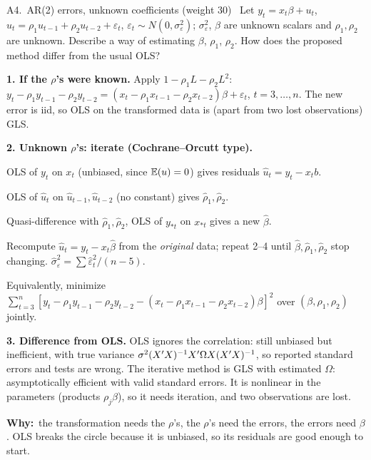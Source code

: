 \documentclass[11pt]{article}
\newcommand{\tagbox}[2]{\tcbox[on line, colback=#1, colframe=#1, coltext=white,
  boxsep=1pt, left=3pt, right=3pt, top=0pt, bottom=0pt, arc=1.5pt]{\scriptsize\sffamily\bfseries #2}}
\newcommand{\must}{\tagbox{examred}{$\star\star\star$ MUST}}
\newcommand{\examtag}[1]{\tagbox{examred!80!black}{EXAM #1}}
\newcommand{\step}[1]{\par\smallskip\noindent\textbf{\textcolor{qnavy}{#1}}\quad\ignorespaces}
\newcommand{\Why}{\textbf{\textcolor{whyline}{Why:}}\ }
\begin{document}
\begin{qbox}{A4.\ AR(2) errors, unknown coefficients \quad(weight 30)}{\must\ \examtag{F2023 Q1}}
Let $y_{t} = x_{t}\beta + u_{t}$, $u_{t} = \rho_{1}u_{t-1} + \rho_{2}u_{t-2} + \varepsilon_{t}$,
$\varepsilon_{t}\sim N(0,\sigma_{\varepsilon}^{2})$; $\sigma_{\varepsilon}^{2}$, $\beta$ are unknown scalars and
$\rho_{1},\rho_{2}$ are unknown. Describe a way of estimating $\beta$, $\rho_{1}$, $\rho_{2}$. How does the
proposed method differ from the usual OLS?
\end{qbox}
\begin{solbox}
\step{1. If the $\rho$'s were known.} Apply $1-\rho_{1}L-\rho_{2}L^{2}$:
$y_{t}-\rho_{1}y_{t-1}-\rho_{2}y_{t-2} = (x_{t}-\rho_{1}x_{t-1}-\rho_{2}x_{t-2})\beta + \varepsilon_{t}$, $t=3,\dots,n$.
The new error is iid, so OLS on the transformed data is (apart from two lost observations) GLS.
\step{2. Unknown $\rho$'s: iterate (Cochrane--Orcutt type).}
\begin{flatnum}
  \item OLS of $y_{t}$ on $x_{t}$ (unbiased, since $\mathbb{E}(u)=0$) gives residuals $\hat u_{t}=y_{t}-x_{t}b$.
  \item OLS of $\hat u_{t}$ on $\hat u_{t-1},\hat u_{t-2}$ (no constant) gives $\hat\rho_{1},\hat\rho_{2}$.
  \item Quasi-difference with $\hat\rho_{1},\hat\rho_{2}$, OLS of $y_{*t}$ on $x_{*t}$ gives a new $\hat\beta$.
  \item Recompute $\hat u_{t}=y_{t}-x_{t}\hat\beta$ from the \emph{original} data; repeat 2--4 until
        $\hat\beta,\hat\rho_{1},\hat\rho_{2}$ stop changing. $\hat\sigma_{\varepsilon}^{2}=\sum\hat\varepsilon_{t}^{2}/(n-5)$.
\end{flatnum}
Equivalently, minimize $\sum_{t=3}^{n}[y_{t}-\rho_{1}y_{t-1}-\rho_{2}y_{t-2}-(x_{t}-\rho_{1}x_{t-1}-\rho_{2}x_{t-2})\beta]^{2}$
over $(\beta,\rho_{1},\rho_{2})$ jointly.
\step{3. Difference from OLS.} OLS ignores the correlation: still unbiased but inefficient, with true variance
$\sigma^{2}(X^{\prime} X)^{-1}X^{\prime}\Omega X(X^{\prime} X)^{-1}$, so reported standard errors and tests are wrong. The iterative method is
GLS with estimated $\Omega$: asymptotically efficient with valid standard errors. It is nonlinear in the parameters
(products $\rho_{j}\beta$), so it needs iteration, and two observations are lost.
\begin{why}\Why the transformation needs the $\rho$'s, the $\rho$'s need the errors, the errors need $\beta$. OLS breaks the
circle because it is unbiased, so its residuals are good enough to start.\end{why}
\end{solbox}
\end{document}
